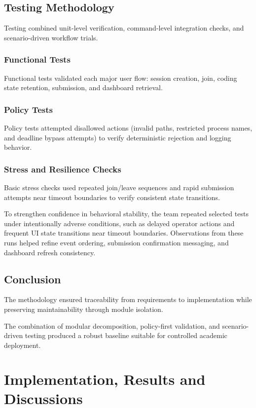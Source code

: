 \documentclass[12pt,a4paper]{report}
\begin{document}
	\section{Testing Methodology}
	Testing combined unit-level verification, command-level integration checks, and scenario-driven workflow trials.
	
	\subsection{Functional Tests}
	Functional tests validated each major user flow: session creation, join, coding state retention, submission, and dashboard retrieval.
	
	\subsection{Policy Tests}
	Policy tests attempted disallowed actions (invalid paths, restricted process names, and deadline bypass attempts) to verify deterministic rejection and logging behavior.
	
	\subsection{Stress and Resilience Checks}
	Basic stress checks used repeated join/leave sequences and rapid submission attempts near timeout boundaries to verify consistent state transitions.
	
	To strengthen confidence in behavioral stability, the team repeated selected tests under intentionally adverse conditions, such as delayed operator actions and frequent UI state transitions near timeout boundaries. Observations from these runs helped refine event ordering, submission confirmation messaging, and dashboard refresh consistency.
	
	\section{Conclusion}
	The methodology ensured traceability from requirements to implementation while preserving maintainability through module isolation.
	
	The combination of modular decomposition, policy-first validation, and scenario-driven testing produced a robust baseline suitable for controlled academic deployment.
	
	\chapter{Implementation, Results and Discussions}
	
\end{document}
